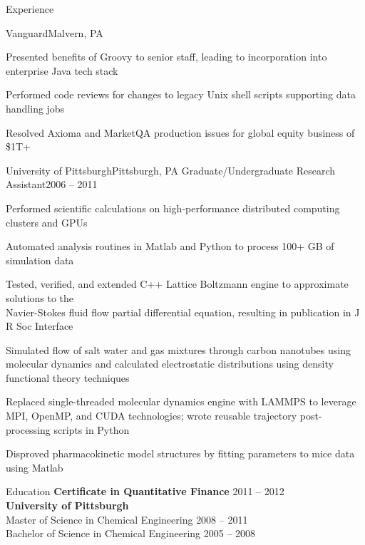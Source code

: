 \documentclass{resume}
\begin{document}
\begin{rSection}{Experience}
\begin{rSubsection}{Vanguard}{Malvern, PA}
\item Presented benefits of Groovy to senior staff, leading to
incorporation into enterprise Java tech stack
\item Performed code reviews for changes to legacy Unix shell
scripts supporting data handling jobs
\item Resolved Axioma and MarketQA production issues for global
equity business of \$1T+

\end{rSubsection}


\begin{rSubsection}{University of Pittsburgh}{Pittsburgh, PA}
{Graduate\slash Undergraduate Research Assistant}{2006 -- 2011}

\item Performed scientific calculations on high-performance distributed
computing clusters and GPUs
\item Automated analysis routines in Matlab and Python
to process 100+ GB of simulation data
\item Tested, verified, and extended C++ Lattice Boltzmann engine to
approximate solutions to the \\ Navier-Stokes fluid flow partial
differential equation, resulting in publication in J R Soc Interface
\item Simulated flow of salt water and gas mixtures
through carbon nanotubes using molecular dynamics and calculated
electrostatic distributions using density functional theory techniques
\item Replaced single-threaded molecular dynamics engine with LAMMPS
to leverage MPI, OpenMP, and CUDA technologies;
wrote reusable trajectory post-processing scripts in Python
\item Disproved pharmacokinetic model structures by fitting
parameters to mice data using Matlab

\end{rSubsection}

\end{rSection}


\begin{rSection}{Education}
{\bf Certificate in Quantitative Finance} \hfill {2011 -- 2012} \\
{\bf University of Pittsburgh} \\ 
Master of Science in Chemical Engineering \hfill {2008 -- 2011} \\
Bachelor of Science in Chemical Engineering \hfill {2005 -- 2008}
\end{rSection}
\end{document}

